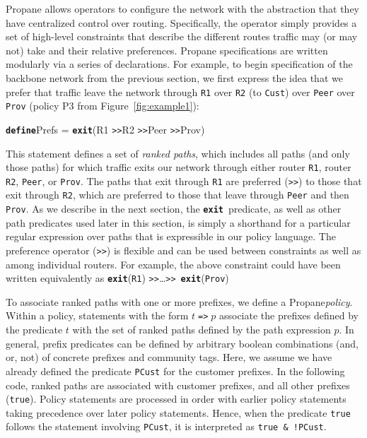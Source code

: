 \documentclass[10pt]{sigalternate052015}
\newcommand{\sysname}{{\small \sf Propane}\xspace}
\newcommand{\CD}[1]{\texttt{\small #1}}  %
\newcommand{\KW}[1]{\texttt{\small\bfseries{#1}}}
\newcommand{\True}{\CD{true}}
\newcommand{\Define}{\KW{define}}
\newcommand{\Prefer}{\texttt{>>}}
\newcommand{\Path}{\texttt{=>}}
\newcommand{\AND}{\texttt{\&}}
\newcommand{\NOT}{\texttt{!}}
\newcommand{\Exit}{\KW{exit}}
\begin{document}
\sysname allows operators to configure the network with the
abstraction that they have centralized control over routing.
Specifically, the operator simply provides a set of high-level constraints
that describe the 
different routes traffic may (or may not) take and their relative preferences.
\sysname specifications are written modularly via a series
of declarations.
For example, to begin specification of the backbone
network from the previous section, we first express the idea that 
we prefer that traffic leave the network through \CD{R1} over \CD{R2} (to \CD{Cust}) over \CD{Peer} over \CD{Prov} (policy P3 from Figure~\ref{fig:example1}):
\begin{code}
\Define Prefs = \Exit(R1 \Prefer R2 \Prefer Peer \Prefer Prov)
\end{code}
This  statement defines a set of \emph{ranked paths}, which includes
all paths (and only those paths) for which traffic exits our network
through either router \CD{R1}, router \CD{R2}, \CD{Peer}, or \CD{Prov}.  
The paths that exit through \CD{R1}
are preferred (\Prefer) to those that exit through \CD{R2}, which are preferred to those that 
leave through \CD{Peer} and then \CD{Prov}.  As we
describe in the next section, the \Exit\ predicate, as well as other
path predicates used later in this section, is simply a shorthand for 
a particular regular expression over paths that is expressible in our policy
language. The preference operator (\Prefer) is flexible and can be used between constraints as well as among individual routers. For example, the above constraint could have been written equivalently as 
\Exit(\CD{R1}) \Prefer \ldots \Prefer ~\Exit(\CD{Prov})

To associate ranked paths with
one or more prefixes, we define a \sysname \emph{policy}.
Within a policy, statements with the form $t\;$\Path$\;p$
associate the prefixes defined by the predicate $t$ with the set of
ranked paths defined by the path expression $p$.  In general,
prefix predicates can be defined by arbitrary boolean combinations
(and, or, not) of concrete prefixes and community tags.  Here,
we assume we have already defined the predicate \CD{PCust} for the
customer prefixes.
In the following code, ranked paths are associated with
customer prefixes,
and all other prefixes (\CD{true}). Policy statements are processed in
order with earlier policy statements taking precedence over later
policy statements. Hence, when the predicate \True{} follows
the statement involving \CD{PCust}, it is interpreted as
\CD{\True{} \AND{} \NOT{}PCust}.
\end{document}

